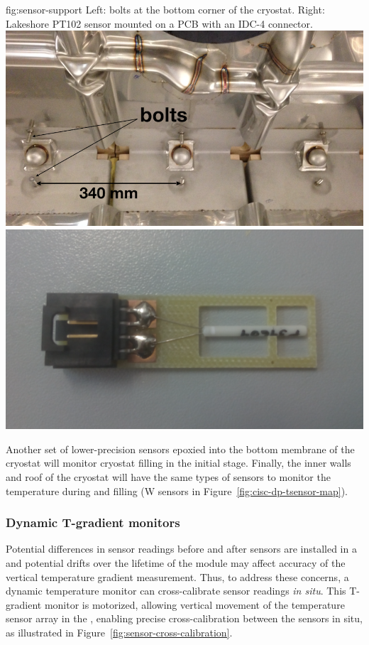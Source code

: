 \begin{dunefigure}{fig:sensor-support}
  {Left: bolts at the bottom corner of the cryostat. Right: Lakeshore PT102 sensor mounted on a PCB with an IDC-4 connector.}
  \includegraphics[height=0.2\textwidth]{graphics/cisc_cryostat_bolts.png}%
    \hspace{1cm}%
  \includegraphics[height=0.2\textwidth]{graphics/cisc_tsensor.png}%
\end{dunefigure}


Another set of lower-precision sensors epoxied into the bottom membrane of the cryostat will monitor  cryostat filling in the initial stage.   
Finally, the inner walls and roof of the cryostat will have the same types of sensors to monitor the temperature during \cooldown and filling (W sensors in Figure~\ref{fig:cisc-dp-tsensor-map}).
 

\subsubsection{Dynamic T-gradient monitors}
\label{sec:fdgen-slow-cryo-dynamic-therm}

 Potential differences in sensor readings before and after sensors are installed in a  and potential drifts over the lifetime of the %
 module may affect accuracy of the vertical temperature gradient measurement. Thus, to address these concerns, %
 a dynamic temperature monitor can cross-calibrate  sensor readings %
 \textit{in situ}.
This T-gradient monitor is motorized, allowing vertical movement of the temperature sensor array %
in the , %
enabling precise cross-calibration between the sensors %
in situ, as illustrated in Figure~\ref{fig:sensor-cross-calibration}.  

